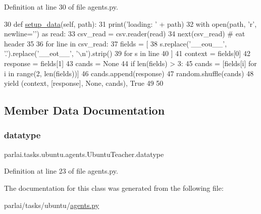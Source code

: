 Definition at line 30 of file agents.\+py.


\begin{DoxyCode}
30     \textcolor{keyword}{def }\hyperlink{namespaceparlai_1_1tasks_1_1multinli_1_1agents_a4fa2cb0ba1ed745336ad8bceed36b841}{setup\_data}(self, path):
31         print(\textcolor{stringliteral}{'loading: '} + path)
32         with open(path, \textcolor{stringliteral}{'r', newline='}') as read:
33             csv\_read = csv.reader(read)
34             next(csv\_read)  \textcolor{comment}{# eat header}
35 
36             \textcolor{keywordflow}{for} line \textcolor{keywordflow}{in} csv\_read:
37                 fields = [
38                     s.replace(\textcolor{stringliteral}{'\_\_eou\_\_'}, \textcolor{stringliteral}{'.'}).replace(\textcolor{stringliteral}{'\_\_eot\_\_'}, \textcolor{stringliteral}{'\(\backslash\)n'}).strip()
39                     \textcolor{keywordflow}{for} s \textcolor{keywordflow}{in} line
40                 ]
41                 context = fields[0]
42                 response = fields[1]
43                 cands = \textcolor{keywordtype}{None}
44                 \textcolor{keywordflow}{if} len(fields) > 3:
45                     cands = [fields[i] \textcolor{keywordflow}{for} i \textcolor{keywordflow}{in} range(2, len(fields))]
46                     cands.append(response)
47                     random.shuffle(cands)
48                 \textcolor{keywordflow}{yield} (context, [response], \textcolor{keywordtype}{None}, cands), \textcolor{keyword}{True}
49 
50 
\end{DoxyCode}


\subsection{Member Data Documentation}
\mbox{\label{classparlai_1_1tasks_1_1ubuntu_1_1agents_1_1UbuntuTeacher_ae664115e7a564e2a816adc8ecc6ea831}} 
\subsubsection{\texorpdfstring{datatype}{datatype}}
{\footnotesize\ttfamily parlai.\+tasks.\+ubuntu.\+agents.\+Ubuntu\+Teacher.\+datatype}



Definition at line 23 of file agents.\+py.



The documentation for this class was generated from the following file\+:\begin{DoxyCompactItemize}
\item 
parlai/tasks/ubuntu/\hyperlink{parlai_2tasks_2ubuntu_2agents_8py}{agents.\+py}\end{DoxyCompactItemize}
